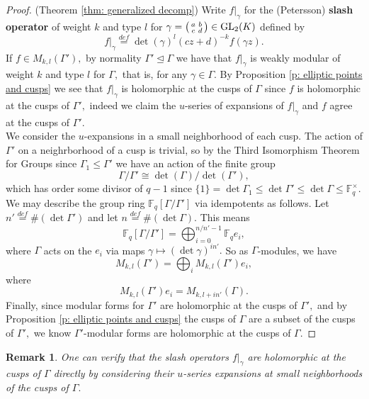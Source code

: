 \documentclass[11pt]{amsart}
\newtheorem{remark}[theorem]{Remark}
\theoremstyle{definition}
\newenvironment{psmallmatrix}
{\left(\begin{smallmatrix}}
	{\end{smallmatrix}\right)}
\numberwithin{equation}{section}
\newcommand{\GL}{\mathrm{GL}} 	%
\newcommand{\bbF}{\mathbb{F}}		%
\begin{document}
\begin{proof}(Theorem \ref{thm: generalized decomp})
	Write $f|_{\gamma}$ for the (Petersson) \textbf{slash operator} of weight $k$ and type $l$ for $\displaystyle{\gamma=\begin{psmallmatrix}a&b\\c&d\end{psmallmatrix}\in \GL_2(K)}$ defined by \[f|_{\gamma}\overset{def}{=}\det(\gamma)^l(cz+d)^{-k}f(\gamma z).\] If $f\in M_{k,l}(\Gamma'),$ by normality $\Gamma'\unlhd \Gamma$ we have that $f|_{\gamma}$ is weakly modular of weight $k$ and type $l$ for $\Gamma,$ that is, for any $\gamma\in \Gamma.$ By Proposition \ref{p: elliptic points and cusps} we see that $f|_{\gamma}$ is holomorphic at the cusps of $\Gamma$ since $f$ is holomorphic at the cusps of $\Gamma',$ indeed we claim the $u$-series of expansions of $f|_{\gamma}$ and $f$ agree at the cusps of $\Gamma'.$\\
	
	We consider the $u$-expansions in a small neighborhood of each cusp. The action of $\Gamma'$ on a neighrborhood of a cusp is trivial, so by the Third Isomorphism Theorem for Groups since $\Gamma_1\leq \Gamma'$ we have an action of the finite group \[\Gamma/\Gamma'\cong\det(\Gamma)/\det(\Gamma'),\] which has order some divisor of $q-1$ since $\{1\}=\det \Gamma_1\leq \det\Gamma'\leq \det\Gamma\leq \bbF_q^{\times}.$ We may describe the group ring $\bbF_q[\Gamma/\Gamma']$ via idempotents as follows. Let $n'\overset{def}{=}\#(\det\Gamma')$ and let $n\overset{def}{=}\#(\det\Gamma).$ This means 
	\[\bbF_q[\Gamma/\Gamma']=\bigoplus_{i=0}^{n/n'-1}\bbF_qe_i,\]
	where $\Gamma$ acts on the $e_i$ via maps $\gamma\mapsto (\det\gamma)^{in'}.$ So as $\Gamma$-modules, we have \[M_{k,l}(\Gamma')=\bigoplus_i M_{k,l}(\Gamma')e_i,\] where \[M_{k,l}(\Gamma')e_i=M_{k,l+in'}(\Gamma).\] Finally, since modular forms for $\Gamma'$ are holomorphic at the cusps of $\Gamma',$ and by Proposition \ref{p: elliptic points and cusps} the cusps of $\Gamma$ are a subset of the cusps of $\Gamma',$ we know $\Gamma'$-modular forms are holomorphic at the cusps of $\Gamma.$
\end{proof}

\begin{remark}
	One can verify that the slash operators $f|_{\gamma}$ are holomorphic at the cusps of $\Gamma$ directly by considering their $u$-series expansions at small neighborhoods of the cusps of $\Gamma.$
\end{remark}
\end{document}
